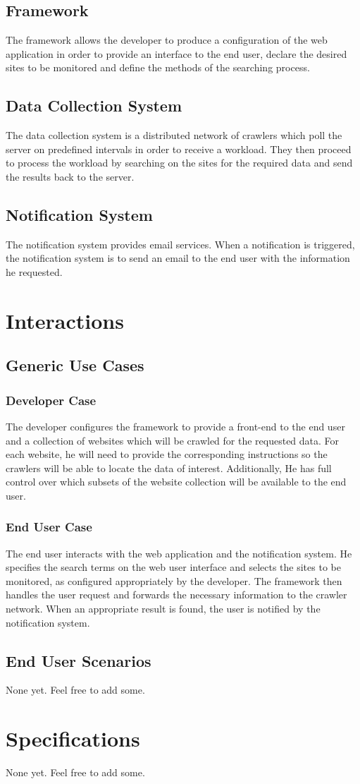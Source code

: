 \documentclass[a4paper,10pt]{article} \usepackage{anysize}
\begin{document}
    \subsection{Framework}
        The framework allows the developer to produce a configuration of the web
        application in order to provide an interface to the end user, declare the
        desired sites to be monitored and define the methods of the searching process.
    \subsection{Data Collection System}
        The data collection system is a distributed network of crawlers which poll
        the server on predefined intervals in order to receive a workload. They then
        proceed to process the workload by searching on the sites for the required data 
        and send the results back to the server.
    \subsection{Notification System}
        The notification system provides email services. When a notification is
        triggered, the notification system is to send an email to the end user
        with the information he requested.
\section{Interactions}
    \subsection{Generic Use Cases}
        \subsubsection{Developer Case}
            The developer configures the framework to provide a front-end to the end user
            and a collection of websites which will be crawled for the requested data.
            For each website, he will need to provide the corresponding instructions
            so the crawlers will be able to locate the data of interest.
            Additionally, He has full control over which subsets of the website collection
            will be available to the end user.
        \subsubsection{End User Case}
            The end user interacts with the web application and the notification
            system. He specifies the search terms on the web user interface and selects
            the sites to be monitored, as configured appropriately by the developer. 
            The framework then handles the user request and forwards the necessary 
            information to the crawler network. When an appropriate result is found, 
            the user is notified by the notification system.

    \subsection{End User Scenarios}
        None yet. Feel free to add some.

\section{Specifications}
    None yet. Feel free to add some.
\end{document}
